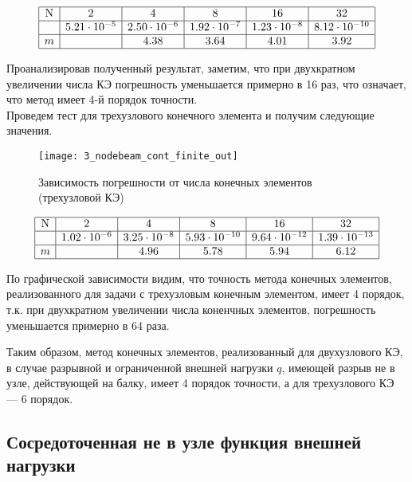 \documentclass[12pt,a4paper]{article}
\begin{document}
\[
\begin{array}{|c|c|c|c|c|c|}
\hline
\text{N} & 2 & 4 & 8 & 16 & 32 \\ \hline
\Delta  & 5.21 \cdot 10^{-5} & 2.50 \cdot 10^{-6} & 1.92 \cdot 10^{-7} & 1.23 \cdot 10^{-8} & 8.12 \cdot 10^{-10} \\ \hline
m  &  & 4.38 & 3.64 & 4.01 & 3.92 \\ 
\hline
\end{array}
\]

Проанализировав полученный результат, заметим, что при двухкратном увеличении числа КЭ погрешность уменьшается примерно в 16 раз, что означает, что метод имеет 4-й порядок точности.\\


 Проведем тест для трехузлового конечного элемента и получим следующие значения. 
\begin{figure}[H]
		\centering
		\texttt{[image: 3\_nodebeam\_cont\_finite\_out]}
		\caption{Зависимость погрешности от числа конечных элементов (трехузловой КЭ)}
		\label{fig:3_nodebeam_cont_finite_out}
	\end{figure}


\[
\begin{array}{|c|c|c|c|c|c|}
\hline
\text{N} & 2 & 4 & 8 & 16 & 32\\ \hline
\Delta  & 1.02 \cdot 10^{-6} & 3.25 \cdot 10^{-8} & 5.93 \cdot 10^{-10} & 9.64 \cdot 10^{-12} & 1.39 \cdot 10^{-13}\\ \hline
m  &  &  4.96 & 5.78 & 5.94 & 6.12 \\ 
\hline
\end{array}
\]

По графической зависимости видим, что точность метода конечных элементов, реализованного для задачи с 	трехузловым конечным элементом, имеет 4 порядок, т.к. при двухкратном увеличении числа коненчных элементов, погрешность уменьшается примерно в 64 раза. 


Таким образом, метод конечных элементов, реализованный для двухузлового КЭ, в случае разрывной и ограниченной внешней нагрузки $q$, имеющей разрыв не в узле, действующей на балку, имеет 4 порядок точности, а для трехузлового КЭ --- 6 порядок. 

\subsection[Сосредоточенная функция внешней нагрузки]{Сосредоточенная не в узле функция внешней нагрузки}
\end{document}
